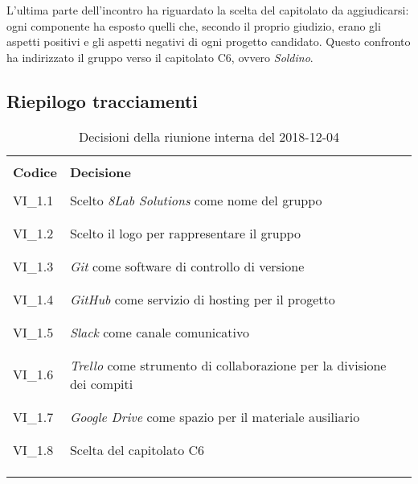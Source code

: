 \noindent L'ultima parte dell'incontro ha riguardato la scelta del capitolato da 
aggiudicarsi: ogni componente ha esposto quelli che, secondo il proprio 
giudizio, erano gli aspetti positivi e gli aspetti negativi di ogni progetto 
candidato. Questo confronto ha indirizzato il gruppo verso il capitolato C6,
ovvero \textit{Soldino}. 

\subsection{Riepilogo tracciamenti}
\begin{centering}
\begin{longtable}{ >{\centering}p{4cm} >{\centering}p{11cm} }

\hline
\\[0.5pt]
	\textbf{Codice} & \textbf{Decisione} 
	
	\tabularnewline 
	\hline
	
	
				\\[0.5pt]
				VI\_1.1 & Scelto \textit{8Lab Solutions} come nome del gruppo
				\\[0.5pt]
				\tabularnewline
				\hline
						
				\\[0.5pt]
				VI\_1.2 & Scelto il logo per rappresentare il gruppo
				\\[0.5pt]
				\tabularnewline
				\hline
				
				\\[0.5pt]
				VI\_1.3 & \textit{Git} come software di controllo di versione
				\\[0.5pt]
				\tabularnewline
				\hline
				
				\\[0.5pt]				
				VI\_1.4 & \textit{GitHub} come servizio di hosting per il progetto
				\\[0.5pt]
				\tabularnewline
				\hline
				
				\\[0.5pt]
				VI\_1.5 & \textit{Slack} come canale comunicativo 
				\\[0.5pt]
				\tabularnewline
				\hline
				
				\\[0.5pt]
				VI\_1.6 & \textit{Trello} come strumento di collaborazione per la divisione 
				dei compiti
				\\[0.5pt]
				\tabularnewline
				\hline
		
				\\[0.5pt]
				VI\_1.7 & \textit{Google Drive} come spazio per il materiale ausiliario
				\\[0.5pt]
				\tabularnewline
				\hline
			
				\\[0.5pt]
				VI\_1.8 & Scelta del capitolato C6
				\\[0.5pt]
				\tabularnewline
              	\hline 
           	
                
        \\[0.7pt]
        \caption{Decisioni della riunione interna del 2018-12-04}
\end{longtable}
\end{centering}

